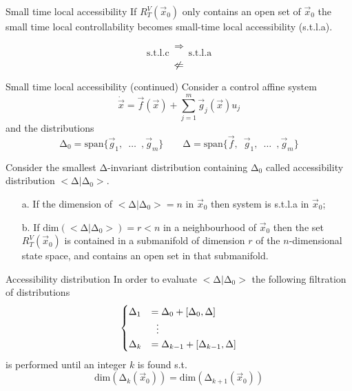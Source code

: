 \begin{frame}{Small time local accessibility \theory}
  If $R_{T}^{V}(\vec{x}_0)$ only contains an open set of $\vec{x}_0$
  the small time local controllability becomes \alert{small-time local accessibility}
  (s.t.l.a).
  \par
  \[
  \Rightarrow
  \]
  \[
  \text{s.t.l.c} \qquad \text{s.t.l.a}
  \]
  \[
  \centernot \Leftarrow
  \]
\end{frame}

\begin{frame}[shrink=10]{Small time local accessibility (continued) \theory}
  Consider a control affine system
  \[
  \dot{\vec{x}} = \vec{f}(\vec{x}) + \sum\limits_{j=1}^{m}\vec{g}_j(\vec{x}) u_{j}
  \]
  and the distributions
  \[
  \mathrm{\Delta}_0 = \mathrm{span} \{\vec{g}_1, \enspace \hdots \enspace, \vec{g}_m\} \quad
  \quad
  \mathrm{\Delta} = \mathrm{span} \{\vec{f},\enspace\vec{g}_1, \enspace \hdots \enspace, \vec{g}_m\}
  \]
  \begin{theorem}
    Consider the smallest $\mathrm{\Delta}$-invariant distribution containing $\mathrm{\Delta}_0$
    called \alert{accessibility distribution} $<\mathrm{\Delta}|\mathrm{\Delta}_0>$.
    \begin{itemize}
    \item[a.]If the dimension of $<\mathrm{\Delta}|\mathrm{\Delta}_0>= n$ in $\vec{x}_0$ then system
      is \alert{s.t.l.a in $\vec{x}_{0}$};
    \item[b.]If $\mathrm{dim}(<\mathrm{\Delta}|\mathrm{\Delta}_0>)= r < n$ in a neighbourhood of $\vec{x}_0$
      then the set $R_{T}^{V}(\vec{x}_0)$ is contained in a submanifold of dimension $r$ of the
      $n$-dimensional state space, and contains an open set in that submanifold.
    \end{itemize}
  \end{theorem}
\end{frame}

\begin{frame}{Accessibility distribution \theory}
  In order to evaluate $<\mathrm{\Delta}|\mathrm{\Delta}_0>$
  the following filtration of distributions
  \[
  \begin{cases}
    \mathrm{\Delta}_1 &= \mathrm{\Delta}_0 + [\mathrm{\Delta}_0,\mathrm{\Delta}]\\
    &\vdotswithin{=} \\
    \mathrm{\Delta}_k &= \mathrm{\Delta}_{k-1} + [\mathrm{\Delta}_{k-1},\mathrm{\Delta}]
  \end{cases}
  \]
  is performed until an integer $k$ is found s.t.
  \[
  \text{dim}(\mathrm{\Delta}_{k}(\vec{x}_0)) = \text{dim}(\mathrm{\Delta}_{k+1}(\vec{x}_0))
  \]
\end{frame}


